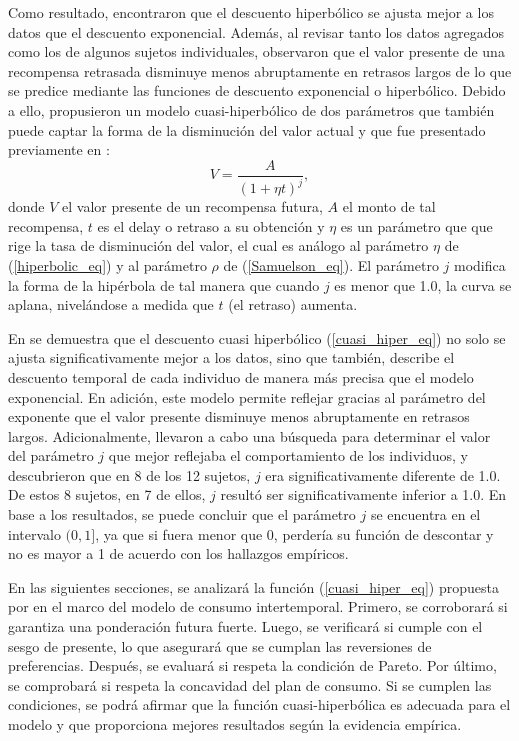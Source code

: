 Como resultado, encontraron que el descuento hiperbólico se ajusta mejor a los datos que el descuento exponencial. Además, al revisar tanto los datos agregados como los de algunos sujetos individuales, observaron que el valor presente de una recompensa retrasada disminuye menos abruptamente en retrasos largos de lo que se predice mediante las funciones de descuento exponencial o hiperbólico. Debido a ello, propusieron un modelo cuasi-hiperbólico de dos parámetros que también puede captar la forma de la disminución del valor actual y que fue presentado previamente en 
%
\parencite{green1994discounting,loewenstein1992anomalies}:
\begin{equation}
\label{cuasi_hiper_eq}
    V= \frac{A}{(1+ \eta t)^j},
\end{equation}
%
donde $V$ el valor presente de un recompensa futura, $A$ el monto de tal recompensa, $t$ es el delay o retraso a su obtención y  $\eta$ es un parámetro que que rige la tasa de disminución del valor, el cual es análogo al parámetro $\eta$ de (\ref{hiperbolic_eq}) y al parámetro $\rho$ de (\ref{Samuelson_eq}). El parámetro $j$ modifica la forma de la hipérbola de tal manera que cuando $j$ es menor que 1.0, la curva se aplana, nivelándose a medida que $t$ (el retraso) aumenta.  

En \parencite{myerson1995discounting} se demuestra que el descuento cuasi hiperbólico (\ref{cuasi_hiper_eq}) no solo se ajusta significativamente mejor a los datos, sino que también, describe el descuento temporal de cada individuo de manera más precisa que el modelo exponencial. En adición, este modelo permite reflejar gracias al parámetro del exponente que el valor presente disminuye menos abruptamente en retrasos largos. Adicionalmente, llevaron a cabo una búsqueda para determinar el valor del parámetro $j$ que mejor reflejaba el comportamiento de los individuos, y descubrieron que en 8 de los 12 sujetos, $j$ era significativamente diferente de 1.0. De estos 8 sujetos, en 7 de ellos, $j$ resultó ser significativamente inferior a 1.0. En base a los resultados, se puede concluir que el parámetro $j$ se encuentra en el intervalo $(0,1]$, ya que si fuera menor que 0, perdería su función de descontar y no es mayor a 1 de acuerdo con los hallazgos empíricos. 

En las siguientes secciones, se analizará la función (\ref{cuasi_hiper_eq}) propuesta por \textcite{myerson1995discounting} en el marco del modelo de consumo intertemporal. Primero, se corroborará si garantiza una ponderación futura fuerte. Luego, se verificará si cumple con el sesgo de presente, lo que asegurará que se cumplan las reversiones de preferencias. Después, se evaluará si respeta la condición de Pareto. Por último, se comprobará si respeta la concavidad del plan de consumo. Si se cumplen las condiciones, se podrá afirmar que la función cuasi-hiperbólica es adecuada para el modelo y que proporciona mejores resultados según la evidencia empírica.

